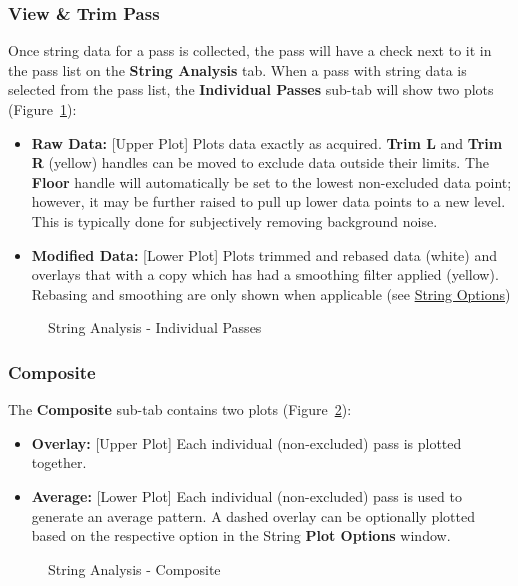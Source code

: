 \documentclass[10pt,letterpaper,titlepage]{article}
\begin{document}
    \subsubsection{View \& Trim Pass}
    Once string data for a pass is collected, the pass will have a check next to it in the pass list on the \textbf{String Analysis} tab. When a pass with string data is selected from the pass list, the \textbf{Individual Passes} sub-tab will show two plots (Figure~\ref{fig:string_individual}): 
    \begin{itemize}
        \item \textbf{Raw Data:} [Upper Plot] Plots data exactly as acquired. \textbf{Trim L} and \textbf{Trim R} (yellow) handles can be moved to exclude data outside their limits. The \textbf{Floor} handle will automatically be set to the lowest non-excluded data point; however, it may be further raised to pull up lower data points to a new level. This is typically done for subjectively removing background noise.
        \item \textbf{Modified Data:} [Lower Plot] Plots trimmed and rebased data (white) and overlays that with a copy which has had a smoothing filter applied (yellow). Rebasing and smoothing are only shown when applicable (see \hyperref[sec:string_options]{String Options})
    \end{itemize}
    \begin{figure}[h]
        \centering
        \caption{String Analysis - Individual Passes}
        \label{fig:string_individual}
    \end{figure}
    \newpage

    \subsubsection{Composite}
    The \textbf{Composite} sub-tab contains two plots (Figure~\ref{fig:string_composite}):
    \begin{itemize}
        \item \textbf{Overlay:} [Upper Plot] Each individual (non-excluded) pass is plotted together. 
        \item \textbf{Average:} [Lower Plot] Each individual (non-excluded) pass is used to generate an average pattern. A dashed overlay can be optionally plotted based on the respective option in the String \textbf{Plot Options} window.
    \end{itemize}
    \begin{figure}[hb]
        \centering
        \caption{String Analysis - Composite}
        \label{fig:string_composite}
    \end{figure}
    \newpage
\end{document}
